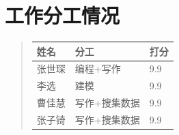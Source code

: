 \documentclass{article}
\begin{document}
\section{工作分工情况}
\begin{quotation}
    \centering
    \begin{table}[H]
            \centering 
            \begin{tabular}{|p{4cm}<{\centering}|p{4cm}<{\centering}|p{4cm}<{\centering}|}
            
                \hline
                姓名& 分工 &打分 \\
                \hline
                张世琛&编程+写作&9.9\\
                \hline
                李选&建模&9.9\\
                \hline
                曹佳慧&写作+搜集数据&9.9\\
                \hline
                张子锜&写作+搜集数据&9.9\\
                \hline
            \end{tabular}
        \end{table}
  \end{quotation}
\end{document}
